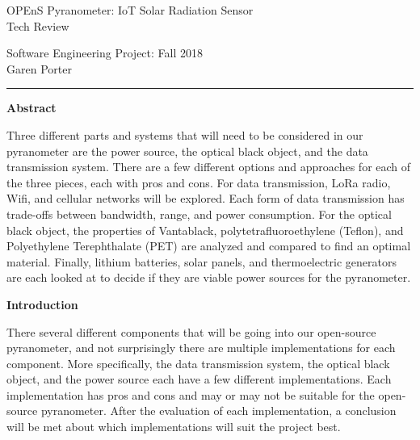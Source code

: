 \documentclass[10pt,draftclsnofoot,onecolumn,letterpaper]{article}
\begin{document}
    \begin{Center}
    {\fontsize{14pt}{16.8pt}\selectfont OPEnS Pyranometer: IoT Solar Radiation Sensor\\ Tech Review\par}
    \end{Center}\par
        
    \begin{Center}
    Software Engineering Project: Fall 2018\\Garen Porter\\
    \end{Center}\par
    \hrule
    \begin{Center}
    {\fontsize{12pt}{16.8pt}\selectfont \textbf{Abstract}\par}
    \end{Center}\par
        
    {\fontsize{10pt}{12.0pt}\selectfont Three different parts and systems that will need to be considered in our pyranometer are the power source, the optical black object, and the data transmission system. There are a few different options and approaches for each of the three pieces, each with pros and cons. For data transmission, LoRa radio, Wifi, and cellular networks will be explored. Each form of data transmission has trade-offs between bandwidth, range, and power consumption. For the optical black object, the properties of Vantablack, polytetrafluoroethylene (Teflon), and Polyethylene Terephthalate (PET) are analyzed and compared to find an optimal material. Finally, lithium batteries, solar panels, and thermoelectric generators are each looked at to decide if they are viable power sources for the pyranometer. 
    \par}\par
        
    \newpage
        
        
    {\fontsize{12pt}{12.0pt} \textbf{Introduction}\\\selectfont 
    \par}\par
    {\fontsize{12pt}{12.0pt} There several different components that will be going into our open-source pyranometer, and not surprisingly there are multiple implementations for each component. More specifically, the data transmission system, the optical black object, and the power source each have a few different implementations. Each implementation has pros and cons and may or may not be suitable for the open-source pyranometer. After the evaluation of each implementation, a conclusion will be met about which implementations will suit the project best.\\\selectfont 
    \par}\par
    
\end{document}
